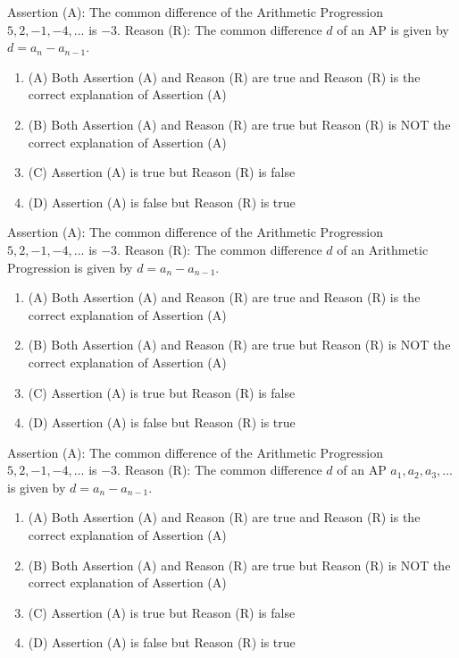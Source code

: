 \documentclass[12pt,a4paper]{exam}
\begin{document}
\begin{questions}
\question[1] Assertion (A): The common difference of the Arithmetic Progression $5, 2, -1, -4, ...$ is $-3$. Reason (R): The common difference $d$ of an AP is given by $d = a_{n} - a_{n-1}$.
\begin{enumerate}[label=(\Alph*)]
  \item (A) Both Assertion (A) and Reason (R) are true and Reason (R) is the correct explanation of Assertion (A)
  \item (B) Both Assertion (A) and Reason (R) are true but Reason (R) is NOT the correct explanation of Assertion (A)
  \item (C) Assertion (A) is true but Reason (R) is false
  \item (D) Assertion (A) is false but Reason (R) is true
\end{enumerate}
\vspace{0.15cm}

\question[1] Assertion (A): The common difference of the Arithmetic Progression $5, 2, -1, -4, ...$ is $-3$.
Reason (R): The common difference $d$ of an Arithmetic Progression is given by $d = a_{n} - a_{n-1}$.
\begin{enumerate}[label=(\Alph*)]
  \item (A) Both Assertion (A) and Reason (R) are true and Reason (R) is the correct explanation of Assertion (A)
  \item (B) Both Assertion (A) and Reason (R) are true but Reason (R) is NOT the correct explanation of Assertion (A)
  \item (C) Assertion (A) is true but Reason (R) is false
  \item (D) Assertion (A) is false but Reason (R) is true
\end{enumerate}
\vspace{0.15cm}

\question[1] Assertion (A): The common difference of the Arithmetic Progression $5, 2, -1, -4, \dots$ is $-3$. 
Reason (R): The common difference $d$ of an AP $a_1, a_2, a_3, \dots$ is given by $d = a_{n} - a_{n-1}$.
\begin{enumerate}[label=(\Alph*)]
  \item (A) Both Assertion (A) and Reason (R) are true and Reason (R) is the correct explanation of Assertion (A)
  \item (B) Both Assertion (A) and Reason (R) are true but Reason (R) is NOT the correct explanation of Assertion (A)
  \item (C) Assertion (A) is true but Reason (R) is false
  \item (D) Assertion (A) is false but Reason (R) is true
\end{enumerate}
\vspace{0.15cm}


\end{questions}
\end{document}
